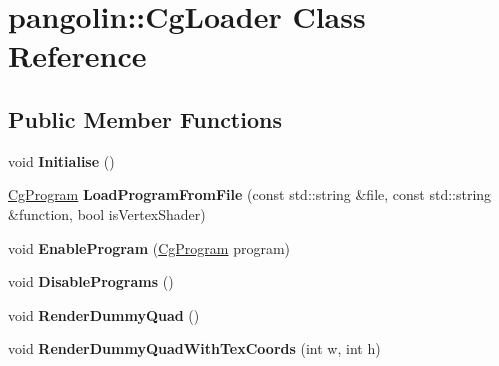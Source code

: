 \hypertarget{classpangolin_1_1_cg_loader}{}\section{pangolin\+:\+:Cg\+Loader Class Reference}
\label{classpangolin_1_1_cg_loader}
\subsection*{Public Member Functions}
\begin{DoxyCompactItemize}
\item 
void {\bfseries Initialise} ()\hypertarget{classpangolin_1_1_cg_loader_aa608b30d63f553dcf5de3f07594b348b}{}\label{classpangolin_1_1_cg_loader_aa608b30d63f553dcf5de3f07594b348b}

\item 
\hyperlink{classpangolin_1_1_cg_program}{Cg\+Program} {\bfseries Load\+Program\+From\+File} (const std\+::string \&file, const std\+::string \&function, bool is\+Vertex\+Shader)\hypertarget{classpangolin_1_1_cg_loader_a2a9d37566910c0e8c17091c3cb3d30ec}{}\label{classpangolin_1_1_cg_loader_a2a9d37566910c0e8c17091c3cb3d30ec}

\item 
void {\bfseries Enable\+Program} (\hyperlink{classpangolin_1_1_cg_program}{Cg\+Program} program)\hypertarget{classpangolin_1_1_cg_loader_a693a9d871cfc0f249f7708e3ae58c07c}{}\label{classpangolin_1_1_cg_loader_a693a9d871cfc0f249f7708e3ae58c07c}

\item 
void {\bfseries Disable\+Programs} ()\hypertarget{classpangolin_1_1_cg_loader_a66bb5d130232afb3ac0b7d1448dc1a9a}{}\label{classpangolin_1_1_cg_loader_a66bb5d130232afb3ac0b7d1448dc1a9a}

\item 
void {\bfseries Render\+Dummy\+Quad} ()\hypertarget{classpangolin_1_1_cg_loader_ad728ee64031964ac4ff90d7775c35153}{}\label{classpangolin_1_1_cg_loader_ad728ee64031964ac4ff90d7775c35153}

\item 
void {\bfseries Render\+Dummy\+Quad\+With\+Tex\+Coords} (int w, int h)\hypertarget{classpangolin_1_1_cg_loader_a56bb178a003230640efacefe1d781054}{}\label{classpangolin_1_1_cg_loader_a56bb178a003230640efacefe1d781054}

\end{DoxyCompactItemize}
